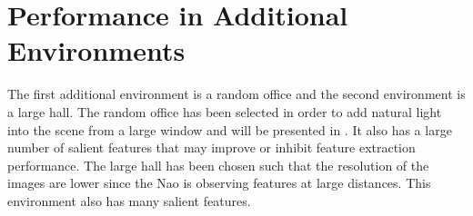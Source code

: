 \documentclass[11pt]{report}
\begin{document}

%


%
\section{Performance in Additional Environments}
\label{sec:additionalDataset}
The first additional environment is a random office and the second environment is a large hall. The random office has been selected in order to add natural light into the scene from a large window and will be presented in . It also has a large number of salient features that may improve or inhibit feature extraction performance. The large hall has been chosen such that the resolution of the images are lower since the Nao is observing features at large distances. This environment also has many salient features. \\
\end{document}
